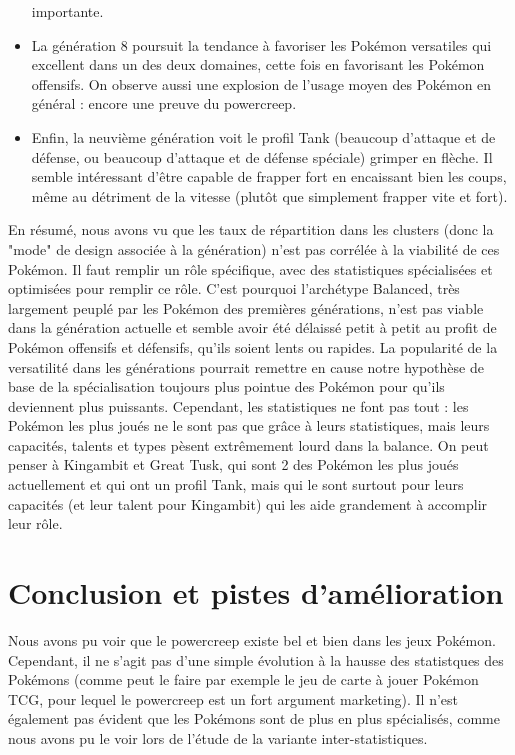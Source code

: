 \documentclass[a4paper,12pt]{article}
\begin{document}
\begin{itemize}
    importante.
    \item La génération 8 poursuit la tendance à favoriser les Pokémon
    versatiles qui excellent dans un des deux domaines, cette fois en favorisant
    les Pokémon offensifs. On observe aussi une explosion de l'usage moyen des
    Pokémon en général : encore une preuve du powercreep.
    \item Enfin, la neuvième génération voit le profil Tank (beaucoup d'attaque
    et de défense, ou beaucoup d'attaque et de défense spéciale) grimper en
    flèche. Il semble intéressant d'être capable de frapper fort en encaissant
    bien les coups, même au détriment de la vitesse (plutôt que simplement
    frapper vite et fort).
    
\end{itemize}

En résumé, nous avons vu que les taux de répartition dans les clusters (donc la
"mode" de design associée à la génération) n'est pas corrélée à la viabilité de
ces Pokémon. Il faut remplir un rôle spécifique, avec des statistiques
spécialisées et optimisées pour remplir ce rôle. C'est pourquoi l'archétype
Balanced, très largement peuplé par les Pokémon des premières générations, n'est
pas viable dans la génération actuelle et semble avoir été délaissé petit à
petit au profit de Pokémon offensifs et défensifs, qu'ils soient lents ou
rapides. La popularité de la versatilité dans les générations pourrait remettre
en cause notre hypothèse de base de la spécialisation toujours plus pointue des
Pokémon pour qu'ils deviennent plus puissants. Cependant, les statistiques ne
font pas tout : les Pokémon les plus joués ne le sont pas que grâce à leurs
statistiques, mais leurs capacités, talents et types pèsent extrêmement lourd
dans la balance. On peut penser à Kingambit et Great Tusk, qui sont 2 des
Pokémon les plus joués actuellement et qui ont un profil Tank, mais qui le sont
surtout pour leurs capacités (et leur talent pour Kingambit) qui les aide
grandement à accomplir leur rôle.

\section{Conclusion et pistes d'amélioration}

Nous avons pu voir que le powercreep existe bel et bien dans les jeux Pokémon.
Cependant, il ne s'agit pas d'une simple évolution à la hausse des statistques
des Pokémons (comme peut le faire par exemple le jeu de carte à jouer Pokémon
TCG, pour lequel le powercreep est un fort argument marketing). Il n'est
également pas évident que les Pokémons sont de plus en plus spécialisés, comme
nous avons pu le voir lors de l'étude de la variante inter-statistiques.
\end{document}
